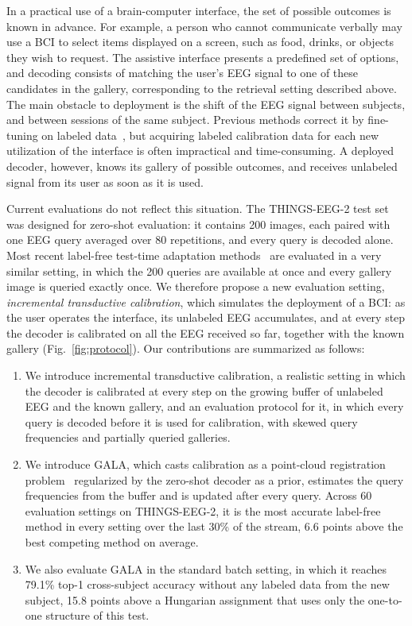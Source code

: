 \documentclass[10pt,twocolumn,letterpaper]{article}
\begin{document}
In a practical use of a brain-computer interface, the set of possible outcomes is known in advance. For example, a person who cannot communicate verbally may use a BCI to select items displayed on a screen, such as food, drinks, or objects they wish to request. The assistive interface presents a predefined set of options, and decoding consists of matching the user's EEG signal to one of these candidates in the gallery, corresponding to the retrieval setting described above. The main obstacle to deployment is the shift of the EEG signal between subjects, and between sessions of the same subject. Previous methods correct it by fine-tuning on labeled data~\cite{kneeland2025enigma}, but acquiring labeled calibration data for each new utilization of the interface is often impractical and time-consuming. A deployed decoder, however, knows its gallery of possible outcomes, and receives unlabeled signal from its user as soon as it is used.

Current evaluations do not reflect this situation. The THINGS-EEG-2 test set was designed for zero-shot evaluation: it contains 200 images, each paired with one EEG query averaged over 80 repetitions, and every query is decoded alone. Most recent label-free test-time adaptation methods~\cite{huang2026sattc,cui2026score} are evaluated in a very similar setting, in which the 200 queries are available at once and every gallery image is queried exactly once. We therefore propose a new evaluation setting, \emph{incremental transductive calibration}, which simulates the deployment of a BCI: as the user operates the interface, its unlabeled EEG accumulates, and at every step the decoder is calibrated on all the EEG received so far, together with the known gallery (Fig.~\ref{fig:protocol}).  Our contributions are summarized as follows:
\begin{enumerate}[leftmargin=1.3em,itemsep=1pt,topsep=2pt]
  \item We introduce incremental transductive calibration, a realistic setting in which the decoder is calibrated at every step on the growing buffer of unlabeled EEG and the known gallery, and an evaluation protocol for it, in which every query is decoded before it is used for calibration, with skewed query frequencies and partially queried galleries.

  \item We introduce GALA, which casts calibration as a point-cloud registration problem~\cite{besl1992method,grave2019wasserstein} regularized by the zero-shot decoder as a prior, estimates the query frequencies from the buffer and is updated after every query. Across 60 evaluation settings on THINGS-EEG-2, it is the most accurate label-free method in every setting over the last 30\% of the stream, 6.6 points above the best competing method on average.
  \item We also evaluate GALA in the standard batch setting, in which it reaches 79.1\% top-1 cross-subject accuracy without any labeled data from the new subject, 15.8 points above a Hungarian assignment that uses only the one-to-one structure of this test.
\end{enumerate}
\end{document}
